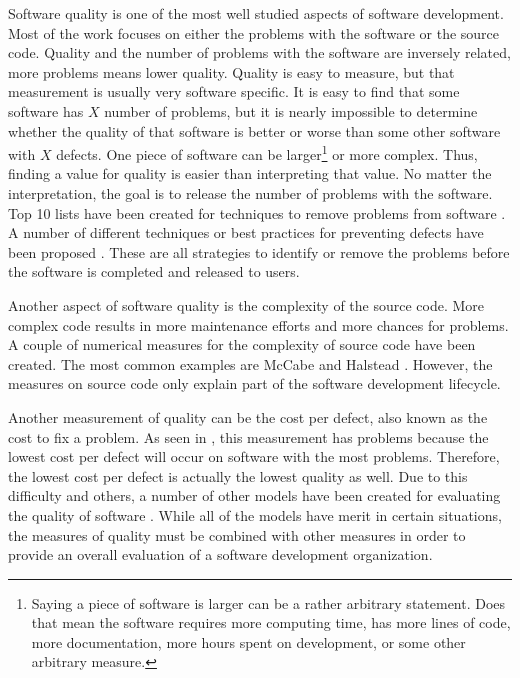 \documentclass[SDSUThesis.tex]{subfiles}
\begin{document}
    Software quality is one of the most well studied aspects
    of software development.  Most of the work focuses on
    either the problems with the software or the source code.
    Quality and the number of problems with the software
    are inversely related, more problems means lower quality. 
    Quality is easy to measure, but 
    that measurement is usually very software specific.  It is easy
    to find that some software has $X$ number of problems, but
    it is nearly impossible to determine whether the quality
    of that software is better or worse than some other software
    with $X$ defects.  One piece of software can be 
    larger\footnote{Saying a piece of software is larger can be a 
    rather arbitrary statement.  Does that mean the software requires 
    more computing time, has more lines of code, more documentation, 
    more hours spent on development, or some other arbitrary measure.}
    or more complex.  Thus, finding a value for quality is easier 
    than interpreting that value.  No matter the interpretation,
    the goal is to release the number of problems with the software.
    Top 10 lists have been created for techniques to remove problems
    from software \cite{Boehm2001}.  
    A number of different techniques or best practices
    for preventing defects have 
    been proposed \cite{Faizan2012}.  These are all strategies to identify
    or remove the problems before the software is completed and released
    to users.  
    
    Another aspect of software quality is the complexity of the 
    source code.  More complex code results in more maintenance efforts and
    more chances for problems. A couple of numerical measures for the 
    complexity of source code have been created.  The most common examples
    are McCabe \cite{McCabe1976} and Halstead \cite{Halstead1977}.
    However, the measures on source code only explain part of the 
    software development lifecycle.  
    
    Another measurement of quality can be the cost per defect, also 
    known as the cost to fix a problem.  As seen in \cite{Jones2013},
    this measurement has problems because the lowest cost per
    defect will occur on software with the most problems.  Therefore,
    the lowest cost per defect is actually the lowest quality as well.
    Due to this difficulty and others, a number of other models
    have been created for evaluating the quality of software 
    \cite{Miguel2014}.  While all of the models have merit
    in certain situations, the measures of quality must be combined
    with other measures in order to provide an overall evaluation
    of a software development organization.
    
\end{document}
